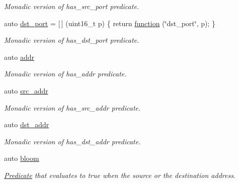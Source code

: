 \begin{DoxyCompactItemize}
\begin{DoxyCompactList}\small\item\em Monadic version of {\ttfamily has\+\_\+src\+\_\+port} predicate. \end{DoxyCompactList}\item 
auto \hyperlink{namespacepfq_1_1lang_1_1anonymous__namespace_02default_8hpp_03_a25a3b35caf255c109a6c5b4f601b1b61}{dst\+\_\+port} = \mbox{[}$\,$\mbox{]} (uint16\+\_\+t p) \{ return \hyperlink{namespacepfq_1_1lang_a1a4638059d700ae08d0ca63886ff2bb3}{function} (\char`\"{}dst\+\_\+port\char`\"{}, p); \}
\begin{DoxyCompactList}\small\item\em Monadic version of {\ttfamily has\+\_\+dst\+\_\+port} predicate. \end{DoxyCompactList}\item 
auto \hyperlink{namespacepfq_1_1lang_1_1anonymous__namespace_02default_8hpp_03_a13cabe468839119d8d68540e3c60718b}{addr}
\begin{DoxyCompactList}\small\item\em Monadic version of {\ttfamily has\+\_\+addr} predicate. \end{DoxyCompactList}\item 
auto \hyperlink{namespacepfq_1_1lang_1_1anonymous__namespace_02default_8hpp_03_a2ee09b5a65a64d60bc797b2ecd1c8a4a}{src\+\_\+addr}
\begin{DoxyCompactList}\small\item\em Monadic version of {\ttfamily has\+\_\+src\+\_\+addr} predicate. \end{DoxyCompactList}\item 
auto \hyperlink{namespacepfq_1_1lang_1_1anonymous__namespace_02default_8hpp_03_a3f51de44baa33ff19a94995945636072}{dst\+\_\+addr}
\begin{DoxyCompactList}\small\item\em Monadic version of {\ttfamily has\+\_\+dst\+\_\+addr} predicate. \end{DoxyCompactList}\item 
auto \hyperlink{namespacepfq_1_1lang_1_1anonymous__namespace_02default_8hpp_03_abfcd230137acb93cfd99f7a0a7c1f17f}{bloom}
\begin{DoxyCompactList}\small\item\em \hyperlink{structpfq_1_1lang_1_1Predicate}{Predicate} that evaluates to {\ttfamily true} when the source or the destination address. \end{DoxyCompactList}\item 

\end{DoxyCompactItemize}
